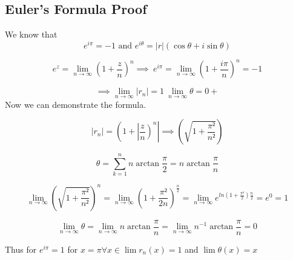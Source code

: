 \subsection{Euler's Formula Proof}
We know that
\[
	e^{i\pi} = -1 \text{ and } e^{i\theta} = |r|(\cos{\theta} + i\sin{\theta})
\]

\[
	e^{z} = \lim_{n \to \infty} \left( 1 + \frac{z}{n}\right)^n \implies\ e^{i\pi} = \lim_{n \to \infty} \left( 1 + \frac{i\pi}{n}\right)^n = -1
\]

\[
	\implies \lim_{n \to \infty} |r_n| = 1\ \lim_{n \to \infty} \theta = 0+
\]
 Now we can demonstrate the formula.

\[
	|r_n| = \left( 1 + \left|\frac{z}{n}\right)^n\right| \implies \left( \sqrt{1 + \frac{\pi²}{n²}}\right)
\]

\[
	\theta = \sum_{k = 1}^{n} n \arctan \frac{\pi}{2} = n \arctan \frac{\pi}{n}
\]

\[
	\lim_{n \to \infty} \left( \sqrt{1 + \frac{\pi²}{n²}}\right)^n = \lim_{n \to \infty} \left( 1 + \frac{\pi²}{2n}\right)^\frac{n}{2}
	= \lim_{n \to \infty} e^{ln\left(1 +\frac{\pi²}{2}\right) \frac{n}{2}} = e^0 = 1
\]

\[
	\lim_{n \to \infty} \theta = \lim_{n \to \infty} n \arctan \frac{\pi}{n} = \lim_{n \to \infty} n^{-1} \arctan\frac{\pi}{n} = 0
\]

Thus for \(e^{i\pi} = 1\) for \(x = \pi \forall x \in \lim r_n (x) = 1\) and \( \lim \theta (x) = x\)

\QED

\newpage